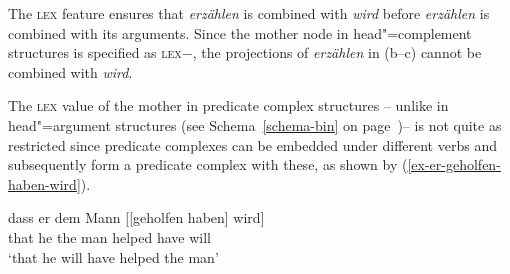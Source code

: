 The \textsc{lex} feature ensures that \emph{erzählen} is combined with \emph{wird} before
\emph{erzählen} is combined with its arguments. Since the mother node in head"=complement
structures is specified as \textsc{lex}$-$, the projections of \emph{erzählen} in (b--c)
cannot be combined with \emph{wird}.




The \textsc{lex} value of the mother in predicate complex structures  -- unlike in head"=argument structures
(see Schema~\ref{schema-bin} on page~\pageref{schema-bin})-- is not quite as restricted since predicate complexes can be
embedded under different verbs and subsequently form a predicate complex with these, as shown by (\ref{ex-er-geholfen-haben-wird}).

\ea
\label{ex-er-geholfen-haben-wird}
\gll dass er dem Mann [[geholfen haben] wird]\\
     that he the man \hspaceThis{[[}helped have will\\
\glt `that he will have helped the man'
\z

